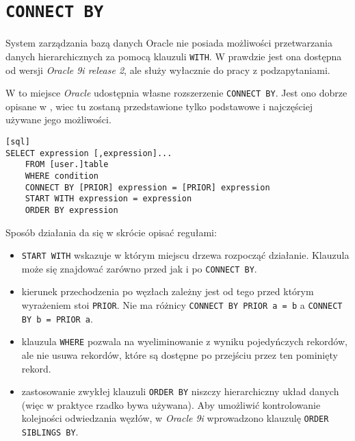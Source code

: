 \section{\texttt{CONNECT BY}}






System zarządzania bazą danych Oracle nie posiada możliwości przetwarzania danych hierarchicznych za pomocą klauzuli \texttt{WITH}.
W prawdzie jest ona dostępna od wersji \emph{Oracle 9i release 2}, ale służy wyłacznie do pracy z podzapytaniami.


W to miejsce \emph{Oracle} udostępnia własne rozszerzenie \texttt{CONNECT BY}. 
Jest ono dobrze opisane w \cite{oracle-ref11},
wiec tu zostaną przedstawione tylko podstawowe i najczęściej używane jego możliwości.



\begin{verbatim}[sql]
SELECT expression [,expression]...
    FROM [user.]table
    WHERE condition
    CONNECT BY [PRIOR] expression = [PRIOR] expression
    START WITH expression = expression
    ORDER BY expression
\end{verbatim}


Sposób działania da się w skrócie opisać regułami:
\begin{itemize}
    \item \texttt{START WITH} wskazuje w którym miejscu drzewa rozpocząć działanie. 
        Klauzula może się znajdować zarówno przed jak i po \texttt{CONNECT BY}.
    \item kierunek przechodzenia po węzłach zależny jest od tego przed którym wyrażeniem stoi \texttt{PRIOR}.
        Nie ma różnicy \verb|CONNECT BY PRIOR a = b| a \verb|CONNECT BY b = PRIOR a|.
    \item klauzula \texttt{WHERE} pozwala na wyeliminowanie z wyniku pojedyńczych rekordów, 
        ale nie usuwa rekordów, które są dostępne po przejściu przez ten pominięty rekord.
    \item zastosowanie zwykłej klauzuli \texttt{ORDER BY} niszczy hierarchiczny układ danych 
        (więc w praktyce rzadko bywa używana).
        Aby umożliwić kontrolowanie kolejności odwiedzania węzłów, 
        w \emph{Oracle 9i} wprowadzono klauzulę \texttt{ORDER SIBLINGS BY}.
\end{itemize}


